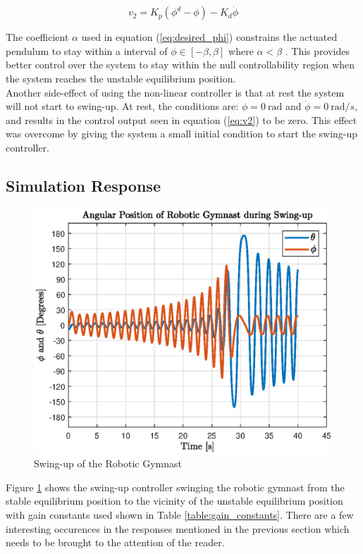    
\begin{equation} \label{eq:v2}
v_{2} = K_{p}(\phi^{d}-\phi)-K_{d}\dot{\phi}
\end{equation}

The coefficient $\alpha$ used in equation (\ref{eq:desired_phi}) constrains the actuated pendulum to stay within a interval of $ \phi \in [-\beta,\beta]$ where $\alpha < \beta$ \cite{spong_swingup}. This provides better control over the system to stay within the null controllability region when the system reaches the unstable equilibrium position.\\

Another side-effect of using the non-linear controller is that at rest the system will not start to swing-up. At rest, the conditions are: $\phi = \SI{0}{\radian}$ and $\dot{\phi} = \SI{0}{\radian/s}$, and results in the control output seen in equation (\ref{eq:v2}) to be zero. This effect was overcome by giving the system a small initial condition to start the swing-up controller.


\subsection{Simulation Response}
\begin{figure}[h]
	\centering
	\includegraphics[scale=1]{./figs/swingup}
	\caption{Swing-up of the Robotic Gymnast}
	\label{fig:swingup}
\end{figure}

Figure \ref{fig:swingup} shows the swing-up controller swinging the robotic gymnast from the stable equilibrium position to the vicinity of the unstable equilibrium position with gain constants used shown in Table \ref{table:gain_constants}. There are a few interesting occurences in the responses mentioned in the previous section which needs to be brought to the attention of the reader.\\

